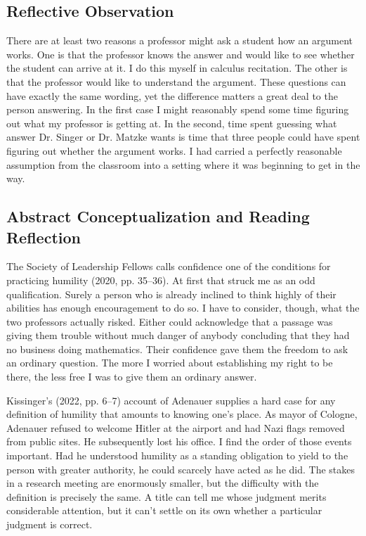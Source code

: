 \documentclass[12pt,letterpaper]{article}
\begin{document}
\subsection{Reflective Observation}
There are at least two reasons a professor might ask a student how an argument works. One is that the professor knows the answer and would like to see whether the student can arrive at it. I do this myself in calculus recitation. The other is that the professor would like to understand the argument. These questions can have exactly the same wording, yet the difference matters a great deal to the person answering. In the first case I might reasonably spend some time figuring out what my professor is getting at. In the second, time spent guessing what answer Dr. Singer or Dr. Matzke wants is time that three people could have spent figuring out whether the argument works. I had carried a perfectly reasonable assumption from the classroom into a setting where it was beginning to get in the way.

\subsection{Abstract Conceptualization and Reading Reflection}
The Society of Leadership Fellows calls confidence one of the conditions for practicing humility (2020, pp. 35--36). At first that struck me as an odd qualification. Surely a person who is already inclined to think highly of their abilities has enough encouragement to do so. I have to consider, though, what the two professors actually risked. Either could acknowledge that a passage was giving them trouble without much danger of anybody concluding that they had no business doing mathematics. Their confidence gave them the freedom to ask an ordinary question. The more I worried about establishing my right to be there, the less free I was to give them an ordinary answer.

Kissinger's (2022, pp. 6--7) account of Adenauer supplies a hard case for any definition of humility that amounts to knowing one's place. As mayor of Cologne, Adenauer refused to welcome Hitler at the airport and had Nazi flags removed from public sites. He subsequently lost his office. I find the order of those events important. Had he understood humility as a standing obligation to yield to the person with greater authority, he could scarcely have acted as he did. The stakes in a research meeting are enormously smaller, but the difficulty with the definition is precisely the same. A title can tell me whose judgment merits considerable attention, but it can't settle on its own whether a particular judgment is correct.
\end{document}
